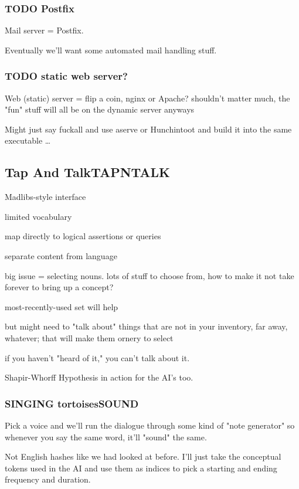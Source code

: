 \documentclass[11pt]{article}
\begin{document}
\subsubsection{{\bfseries\sffamily TODO} Postfix}
\label{sec-1-9-4}

Mail server = Postfix.

Eventually we'll want some automated mail handling stuff.
\subsubsection{{\bfseries\sffamily TODO} static web server?}
\label{sec-1-9-5}

Web (static) server  = flip a coin, nginx or  Apache? shouldn't matter
much, the "fun" stuff will all be on the dynamic server anyways

Might just say fuckall and use aserve or Hunchintoot and build it into
the same executable …
\subsection{Tap And Talk\hfill{}\textsc{TAPNTALK}}
\label{sec-1-10}

Madlibs-style interface

limited vocabulary

map directly to logical assertions or queries

separate content from language

big issue = selecting nouns. lots of stuff to choose from, how to make
it not take forever to bring up a concept?

most-recently-used set will help

but might need to "talk about"  things that are not in your inventory,
far away, whatever; that will make them ornery to select

if you haven't "heard of it," you can't talk about it.

Shapir-Whorff Hypothesis in action for the AI's too.


\subsubsection{SINGING tortoises\hfill{}\textsc{SOUND}}
\label{sec-1-10-1}

Pick a voice and we'll run the dialogue through some kind of "note
generator" so whenever you say the same word, it'll "sound"
the same.

Not English hashes like we had looked at before. I'll just take the
conceptual tokens used in the AI and use them as indices to pick a
starting and ending frequency and duration.
\end{document}
